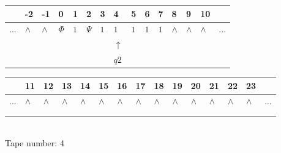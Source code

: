 \documentclass[11pt]{article}
\begin{document}
\begin{table}[H]
\centering
\begin{tabular}{lllllllllllllll}
 & -2 & -1 & 0 & 1 & 2 & 3 & 4 & 5 & 6 & 7 & 8 & 9 & 10 & \\
\hline
$...$ & \multicolumn{1}{|l|}{$\wedge$} & \multicolumn{1}{|l|}{$\wedge$} & \multicolumn{1}{|l|}{$\Phi$} & \multicolumn{1}{|l|}{$1$} & \multicolumn{1}{|l|}{$\Psi$} & \multicolumn{1}{|l|}{$1$} & \multicolumn{1}{|l|}{$1$} & \multicolumn{1}{|l|}{$1$} & \multicolumn{1}{|l|}{$1$} & \multicolumn{1}{|l|}{$1$} & \multicolumn{1}{|l|}{$\wedge$} & \multicolumn{1}{|l|}{$\wedge$} & \multicolumn{1}{|l|}{$\wedge$} & $...$\\
\hline
&  &  &  &  &  &  & $\uparrow$ &  &  &  &  &  &  &  \\
&  &  &  &  &  &  & $ q2 $ &  &  &  &  &  &  &  \\
\end{tabular}
\begin{tabular}{lllllllllllllll}
 & 11 & 12 & 13 & 14 & 15 & 16 & 17 & 18 & 19 & 20 & 21 & 22 & 23 & \\
\hline
$...$ & \multicolumn{1}{|l|}{$\wedge$} & \multicolumn{1}{|l|}{$\wedge$} & \multicolumn{1}{|l|}{$\wedge$} & \multicolumn{1}{|l|}{$\wedge$} & \multicolumn{1}{|l|}{$\wedge$} & \multicolumn{1}{|l|}{$\wedge$} & \multicolumn{1}{|l|}{$\wedge$} & \multicolumn{1}{|l|}{$\wedge$} & \multicolumn{1}{|l|}{$\wedge$} & \multicolumn{1}{|l|}{$\wedge$} & \multicolumn{1}{|l|}{$\wedge$} & \multicolumn{1}{|l|}{$\wedge$} & \multicolumn{1}{|l|}{$\wedge$} & $...$\\
\hline
&  &  &  &  &  &  &  &  &  &  &  &  &  &  \\
&  &  &  &  &  &  &  &  &  &  &  &  &  &  \\
\end{tabular}
\\
Tape number: 4
\noindent\makebox[\linewidth]{\hdashrule{\textwidth}{1pt}{1pt}}\end{table}
\end{document}
